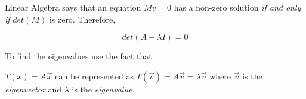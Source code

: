 \documentclass[12pt, a4paper, oneside]{article}\usepackage[]{graphicx}\usepackage[]{color}
\begin{document}
Linear Algebra says that an equation $Mv = 0$ has a non-zero solution \emph{if and only if} $det(M)$ is zero.  Therefore, 

\begin{equation}
det(A - \lambda I) = 0
\end{equation}




To find the eigenvalues use the fact that 

$T(x) = A\overrightarrow{x}$ can be represented as $T(\overrightarrow{v}) = A\overrightarrow{v} = \lambda \overrightarrow{v}$ where $\overrightarrow{v}$ is the \emph{eigenvector} and $\lambda$ is the \emph{eigenvalue}. 
\end{document}
